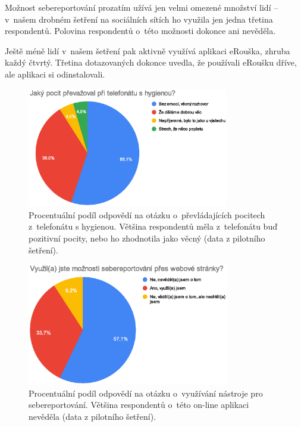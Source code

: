 Možnost sebereportování prozatím užívá jen velmi omezené množství lidí – v~na\-šem drobném šetření na sociálních sítích ho využila jen jedna třetina respondentů. Polovina respondentů o~této možnosti dokonce ani nevěděla. 

Ještě méně lidí v~našem šetření pak aktivně využívá aplikaci eRouška, zhruba každý čtvrtý. Třetina dotazovaných dokonce uvedla, že používali eRoušku dříve, ale aplikaci si odinstalovali.

\pagebreak
\begin{figure}[h!]
\begin{center}
    \includegraphics[width=250pt]{./pic/graf1.eps}
\end{center}    
\caption{Procentuální podíl odpovědí na otázku o~převládajících pocitech z~telefonátu s  hygienou. Většina respondentů měla z~telefonátu buď pozitivní pocity, nebo ho zhodnotila jako věcný (data z pilotního šetření).}
 \end{figure}
\begin{figure}[h!]
\begin{center}
    \includegraphics[width=250pt]{./pic/graf2.eps}
 \end{center}    
    \caption{Procentuální podíl odpovědí na otázku o~využívání nástroje pro sebereportování. Většina respondentů o~této on-line aplikaci nevěděla (data z pilotního šetření).}
\end{figure}
